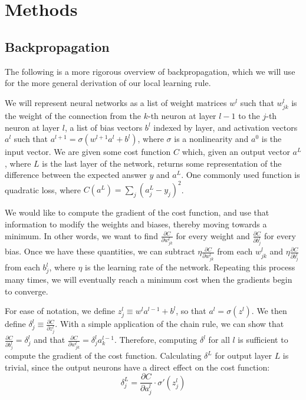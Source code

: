 \documentclass[12pt]{article}
\newcommand{\partialderiv}[2]{\frac{\partial #1}{\partial #2}}
\begin{document}
\section{Methods}
\subsection{Backpropagation}
The following is a more rigorous overview of backpropagation, which we will use for the more general derivation of our local learning rule.

We will represent neural networks as a list of weight matrices $w^l$ such that $w^{l}_{jk}$ is the weight of the connection from the $k$-th neuron at layer $l-1$ to the $j$-th neuron at layer $l$, a list of bias vectors $b^l$ indexed by layer, and activation vectors $a^l$ such that $a^{l+1}=\sigma\left(w^{l+1}a^l + b^l\right)$, where $\sigma$ is a nonlinearity and $a^0$ is the input vector. We are given some cost function $C$ which, given an output vector $a^L$, where $L$ is the last layer of the network, returns some representation of the difference between the expected answer $y$ and $a^L$. One commonly used function is quadratic loss, where $C\left(a^L\right) = \sum_j \left(a^L_j - y_j\right)^2$.

We would like to compute the gradient of the cost function, and use that information to modify the weights and biases, thereby moving towards a minimum. In other words, we want to find $\partialderiv{C}{w^l_{jk}}$ for every weight and $\partialderiv{C}{b^l_j}$ for every bias. Once we have these quantities, we can subtract $\eta\partialderiv{C}{w^l_{jk}}$ from each $w^l_{jk}$ and $\eta\partialderiv{C}{b^l_{j}}$ from each $b^l_j$, where $\eta$ is the learning rate of the network. Repeating this process many times, we will eventually reach a minimum cost when the gradients begin to converge.

For ease of notation, we define $z_j^l \equiv w^l a^{l-1} + b^l$, so that $a^l = \sigma(z^l)$. We then define $\delta_j^l \equiv\partialderiv{C}{z_j^l}$. With a simple application of the chain rule, we can show that $\partialderiv{C}{b_j^l} = \delta_j^l$ and that $\partialderiv{C}{w_{jk}^l} = \delta_j^l a_k^{l-1}$. Therefore, computing $\delta^l$ for all $l$ is sufficient to compute the gradient of the cost function. Calculating $\delta^L$ for output layer $L$ is trivial, since the output neurons have a direct effect on the cost function:
\begin{equation}
	\delta_j^L = \partialderiv{C}{a_j^l}\cdot\sigma'\left(z_j^l\right)\label{eq1}
\end{equation}
\end{document}
